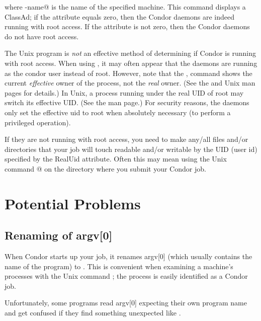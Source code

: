where \verb@machine-name@ is the name of the specified machine.
This command displays a  ClassAd; if the
attribute  equals zero,
then the Condor daemons are indeed
running with root access.  If the
 attribute is not zero, then the Condor daemons do not have
root access.

\Note The Unix program 
is \emph{not} an effective
method of determining if Condor is running with root access.
When using ,
it may often appear that the daemons are
running as the condor user instead of root.
However, note that the ,
command shows the current \emph{effective} owner of the
process, not the \emph{real} owner.  (See the  and
 Unix man pages for details.)  In Unix, a process
running under the real UID of root may switch its effective UID.
(See the  man page.)
For security reasons, the daemons
only set the effective uid to root when absolutely necessary
(to perform a privileged operation).

If they are not running with root access, you need to make any/all files
and/or directories that your job will touch readable and/or writable by
the UID (user id) specified by the RealUid attribute.
Often this may
mean using the Unix command @
on the directory where you submit your Condor job.

\section{Potential Problems}

\subsection{Renaming of argv[0]}

When Condor starts up your job, it renames argv[0] (which usually
contains the name of the program) to .
This is
convenient when examining a machine's processes with the Unix
command ; the process
is easily identified as a Condor job.  

Unfortunately, some programs read argv[0] expecting their own program
name and get confused if they find something unexpected like
.


